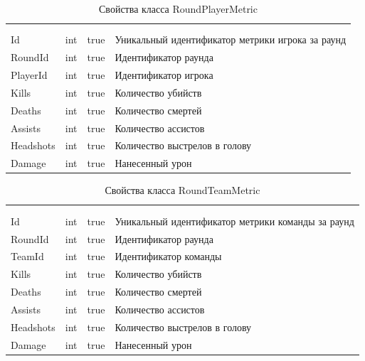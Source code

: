 \begin{xltabular}{\textwidth}{|X|X|X|X|}
	\caption{Свойства класса RoundPlayerMetric}\label{table:RoundPlayerMetric}\\ \hline
	 &  &  &  \\ \hline
	 &  &  &  \\ \hline
	\endfirsthead
	 \hline
	 &  &  &  \\ \hline
	\endhead
	Id & int & true & Уникальный идентификатор метрики игрока за раунд \\ \hline
	RoundId & int & true & Идентификатор раунда \\ \hline
	PlayerId & int & true & Идентификатор игрока \\ \hline
	Kills & int & true & Количество убийств \\ \hline
	Deaths & int & true & Количество смертей \\ \hline
	Assists & int & true & Количество ассистов \\ \hline
	Headshots & int & true & Количество выстрелов в голову \\ \hline
	Damage & int & true & Нанесенный урон \\ \hline
\end{xltabular}

\begin{xltabular}{\textwidth}{|X|X|X|X|}
	\caption{Свойства класса RoundTeamMetric}\label{table:RoundTeamMetric}\\ \hline
	 &  &  &  \\ \hline
	 &  &  &  \\ \hline
	\endfirsthead
	 \hline
	 &  &  &  \\ \hline
	\endhead
	Id & int & true & Уникальный идентификатор метрики команды за раунд \\ \hline
	RoundId & int & true & Идентификатор раунда \\ \hline
	TeamId & int & true & Идентификатор команды \\ \hline
	Kills & int & true & Количество убийств \\ \hline
	Deaths & int & true & Количество смертей \\ \hline
	Assists & int & true & Количество ассистов \\ \hline
	Headshots & int & true & Количество выстрелов в голову \\ \hline
	Damage & int & true & Нанесенный урон \\ \hline
\end{xltabular}

